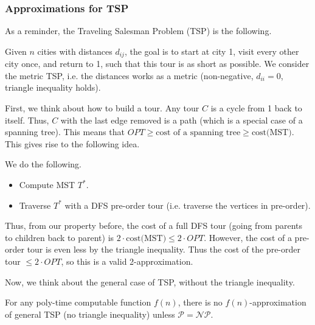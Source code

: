 \subsubsection{Approximations for TSP}

As a reminder, the Traveling Salesman Problem (TSP) is the following.

Given $n$ cities with distances $d_{ij}$, the goal is to start at city 1, visit every other city once, and return to 1, such that this tour is
as short as possible. We consider the metric TSP, i.e. the distances works as a metric (non-negative, $d_{ii} = 0$, triangle inequality holds).

First, we think about how to build a tour. Any tour $C$ is a cycle from 1 back to itself. Thus, $C$ with the last edge removed is a path (which is a special case of a spanning tree).
This means that $OPT \geq \text{cost of a spanning tree} \geq \text{cost(MST)}$. This gives rise to the following idea.

\begin{algothm}
    We do the following.
    \begin{itemize}
        \item Compute MST $T^*$.
        \item Traverse $T^*$ with a DFS pre-order tour (i.e. traverse the vertices in pre-order).
    \end{itemize}

    Thus, from our property before, the cost of a full DFS tour (going from parents to children back to parent) is $2 \cdot \text{cost(MST)} \leq 2 \cdot OPT$. However, the cost of a pre-order
    tour is even less by the triangle inequality. Thus the cost of the pre-order tour $\leq 2 \cdot OPT$, so this is a valid 2-approximation.
\end{algothm}

Now, we think about the general case of TSP, without the triangle inequality.

\begin{theorem}
    For any poly-time computable function $f(n)$, there is no $f(n)$-approximation of general TSP (no triangle inequality) unless $\mathcal{P} = \mathcal{NP}$.
\end{theorem}